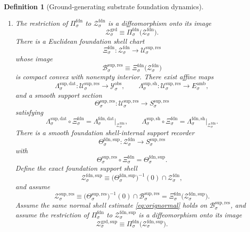 \documentclass[11pt]{article}
\newcommand{\DataSpace}[1]{\mathcal Y_{#1}^{\mathrm{obs}}}
\newcommand{\AmbientTarget}[1]{E_{#1}^{\mathrm{amb}}}
\newcommand{\ResSpace}[1]{\mathcal U_{#1}^{\mathrm{sup,res}}}
\newcommand{\ResBody}[1]{\mathcal B_{#1}^{\mathrm{sup,res}}}
\newcommand{\ResTarget}[1]{S_{#1}^{\mathrm{sup,res}}}
\newcommand{\ResSection}[1]{\Theta_{#1}^{\mathrm{sup,res}}}
\newcommand{\ResData}[1]{\Lambda_{#1}^{\mathrm{sup,dat}}}
\newcommand{\ResShellMap}[1]{\Lambda_{#1}^{\mathrm{sup,sh}}}
\newcommand{\ResShellSet}[1]{\mathcal Z_{#1}^{\mathrm{sup,res}}}
\newcommand{\GroundShellSet}[1]{\mathcal Z_{#1}^{\mathrm{grd}}}
\newcommand{\GroundSupportShell}[1]{\mathcal Z_{#1}^{\mathrm{grd,sup}}}
\newcommand{\FoundProj}[1]{\Pi_{#1}^{\mathrm{fdn}}}
\newcommand{\FoundData}[1]{\Lambda_{#1}^{\mathrm{fdn,dat}}}
\newcommand{\FoundShellMap}[1]{\Lambda_{#1}^{\mathrm{fdn,sh}}}
\newcommand{\FoundShellSet}[1]{\mathcal Z_{#1}^{\mathrm{fdn}}}
\newcommand{\FoundChart}[1]{\Xi_{#1}^{\mathrm{fdn}}}
\newcommand{\FoundSupport}[1]{\Theta_{#1}^{\mathrm{fdn,sup}}}
\newcommand{\FoundSupportShell}[1]{\mathcal Z_{#1}^{\mathrm{fdn,sup}}}
\newtheorem{definition}{Definition}
\begin{document}
\begin{definition}[Ground-generating substrate foundation dynamics]
\begin{enumerate}
    \item The restriction of \(\FoundProj{\sigma}\) to \(\FoundShellSet{\sigma}\) is a diffeomorphism onto its image
    \[
    \GroundShellSet{\sigma}
    \equiv
    \FoundProj{\sigma}\bigl(\FoundShellSet{\sigma}\bigr).
    \]
    There is a Euclidean foundation shell chart
    \[
    \FoundChart{\sigma}:\FoundShellSet{\sigma}\to\ResSpace{\sigma}
    \]
    whose image
    \[
    \ResBody{\sigma}
    \equiv
    \FoundChart{\sigma}\bigl(\FoundShellSet{\sigma}\bigr)
    \]
    is compact convex with nonempty interior. There exist affine maps
    \[
    \ResData{\sigma}:\ResSpace{\sigma}\to\DataSpace{\sigma},
    \qquad
    \ResShellMap{\sigma}:\ResSpace{\sigma}\to\AmbientTarget{\sigma},
    \]
    and a smooth support section
    \[
    \ResSection{\sigma}:\ResSpace{\sigma}\to\ResTarget{\sigma}
    \]
    satisfying
    \begin{equation}
    \ResData{\sigma}\circ\FoundChart{\sigma}
    =
    \FoundData{\sigma}\big|_{\FoundShellSet{\sigma}},
    \qquad
    \ResShellMap{\sigma}\circ\FoundChart{\sigma}
    =
    \FoundShellMap{\sigma}\big|_{\FoundShellSet{\sigma}}.
    \label{eq:foundchartreadouts}
    \end{equation}
    There is a smooth foundation shell-internal support recorder
    \[
    \FoundSupport{\sigma}:\FoundShellSet{\sigma}\to\ResTarget{\sigma}
    \]
    with
    \begin{equation}
    \ResSection{\sigma}\circ\FoundChart{\sigma}
    =
    \FoundSupport{\sigma}.
    \label{eq:foundsupporttransport}
    \end{equation}
    Define the exact foundation support shell
    \begin{equation}
    \FoundSupportShell{\sigma}
    \equiv
    \bigl(\FoundSupport{\sigma}\bigr)^{-1}(0)\cap\FoundShellSet{\sigma},
    \label{eq:foundsupportshell}
    \end{equation}
    and assume
    \begin{equation}
    \ResShellSet{\sigma}
    \equiv
    \bigl(\ResSection{\sigma}\bigr)^{-1}(0)\cap\ResBody{\sigma}
    =
    \FoundChart{\sigma}\bigl(\FoundSupportShell{\sigma}\bigr).
    \label{eq:foundtransportedsupportshell}
    \end{equation}
    Assume the same normal shell estimate \eqref{eq:orignormal} holds on \(\ResBody{\sigma}\), and assume the restriction of \(\FoundProj{\sigma}\) to \(\FoundSupportShell{\sigma}\) is a diffeomorphism onto its image
    \[
    \GroundSupportShell{\sigma}
    \equiv
    \FoundProj{\sigma}\bigl(\FoundSupportShell{\sigma}\bigr).
    \]


\end{enumerate}
\end{definition}
\end{document}
